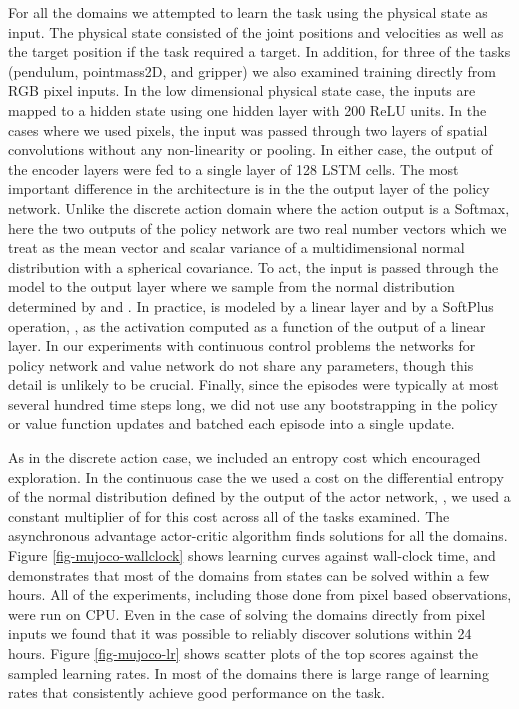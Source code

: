 \documentclass{article} \usepackage{times}
\begin{document}
For all the domains we attempted to learn the task using the physical state as input.
The physical state consisted of the joint positions and velocities as well
as the target position if the task required a target.
In addition, for three of the tasks (pendulum, pointmass2D, and gripper) we also examined
training directly from RGB pixel inputs.
In the low dimensional physical state case, the inputs are mapped to a hidden state using one hidden layer with 200 ReLU units.
In the cases where we used pixels, the input was passed through two layers of spatial convolutions without any non-linearity or pooling.
In either case, the output of the encoder layers were fed to a single layer of 128 LSTM cells.
The most important difference in the architecture is in the the output layer of the policy
network. Unlike the discrete action domain where the action output is a Softmax, here the two outputs
of the policy network are two real number vectors which we treat
as the mean vector  and scalar variance  of a multidimensional normal distribution
with a spherical covariance.
To act, the input is passed through the model to the output layer where we sample from the
normal distribution determined by  and .
In practice,  is modeled by a linear layer and  by a SoftPlus operation, ,
as the activation computed as a function of the output of a linear layer.
In our experiments with continuous control problems the networks for policy network
and value network do not share any parameters, though this detail is unlikely to be crucial.
Finally, since the episodes were typically at most several hundred time steps long, we
did not use any bootstrapping in the policy or value function updates and batched each episode
into a single update.

As in the discrete action case, we included an entropy cost which encouraged exploration.
In the continuous case the we used a cost on the differential entropy of the normal distribution defined by
the output of the actor network, , we used a constant multiplier of  for this cost across all of the tasks
examined.
The asynchronous advantage actor-critic algorithm finds solutions for all the domains.  Figure \ref{fig-mujoco-wallclock}
shows learning curves against wall-clock time, and demonstrates that most of the domains from
states can be solved within a few hours. All of the experiments, including those done
from pixel based observations, were run on CPU.  Even in the case of solving the domains
directly from pixel inputs we found that it was possible to reliably discover solutions
within 24 hours.
Figure \ref{fig-mujoco-lr} shows scatter plots of the top scores against the sampled learning rates.
In most of the domains there is large range of learning rates that consistently achieve good performance
on the task.
\end{document}

